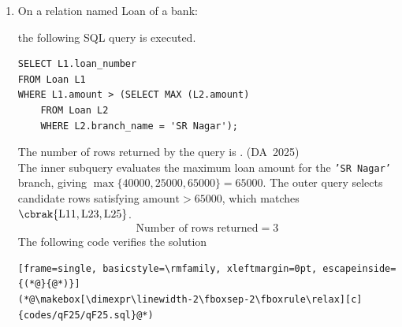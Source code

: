 \begin{enumerate}[label=\thesubsection.\arabic*, ref=\thesubsection.\theenumi]
\begin{itemize}
\begin{lstlisting}[language=bash]
# Start MariaDB server daemon in the background
mysqld_safe &
	\end{lstlisting}
	
	\item Interactive Console Execution (`SOURCE` Command):
	\begin{lstlisting}[language=sql]
	-- Connect to MariaDB console
mariadb -u root
		
	-- Execute .sql script inside interactive shell
SOURCE /sdcard/Download/codes/q40/script.sql;
		
	-- Alternative shortcut notation:
\. /sdcard/Download/codes/q40/script.sql
	\end{lstlisting}
	
	\item Creating Databases and Tables Manually:
	
	If you are not using an external script and want to define your tables directly in the console:
	\begin{lstlisting}[language=sql]
	-- 1. Create and select a database
CREATE DATABASE my_database;
USE my_database;
		
	-- 2. Create a sample table
CREATE TABLE users (
id INT AUTO_INCREMENT PRIMARY KEY,
username VARCHAR(50) NOT NULL,
email VARCHAR(100),
created_at TIMESTAMP DEFAULT CURRENT_TIMESTAMP
	);
		
	-- 3. Verify table creation
SHOW TABLES;
DESCRIBE users;
	\end{lstlisting}
\end{itemize}
	
	
	\item 
	On a relation named Loan of a bank:
	\begin{figure}[H]
		\centering
		
		\caption{}
		\label{fig:DA-LOAN}
	\end{figure}
	the following SQL query is executed.
	\begin{lstlisting}[frame=single, basicstyle=\rmfamily]
SELECT L1.loan_number
FROM Loan L1
WHERE L1.amount > (SELECT MAX (L2.amount)
	FROM Loan L2
	WHERE L2.branch_name = 'SR Nagar');
	\end{lstlisting}
	The number of rows returned by the query is \underline{\hspace{1.5cm}}.
	\hfill (DA~2025)
	\\
	\solution
	The inner subquery evaluates the maximum loan amount for the \texttt{'SR Nagar'} branch, giving $\max\{40000, 25000, 65000\} = 65000$. The outer query selects candidate rows satisfying $\text{amount} > 65000$, which matches $\cbrak{\text{L11}, \text{L23}, \text{L25}}$.
	\begin{align}
		\text{Number of rows returned} = 3
	\end{align}
	The following code verifies the solution
	\begin{lstlisting}[frame=single, basicstyle=\rmfamily, xleftmargin=0pt, escapeinside={(*@}{@*)}]
(*@\makebox[\dimexpr\linewidth-2\fboxsep-2\fboxrule\relax][c]{codes/qF25/qF25.sql}@*)
	\end{lstlisting}
	

\end{enumerate}
